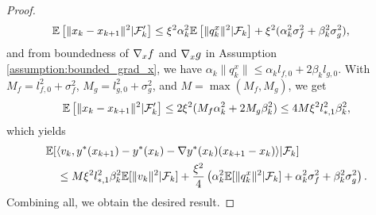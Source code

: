 \begin{proof}
    \begin{align*}
        \mathbb{E}\left[\|x_{k} - x_{k+1}\|^2 | \mathcal{F}_{k}' \right] &\le \xi^2 \alpha_k^2 \mathbb{E}\left[\|q_k^x\|^2 | \mathcal{F}_{k} \right] + \xi^2 (\alpha_k^2 \sigma_f^2 + \beta_k^2 \sigma_g^2),
    \end{align*}
    and from boundedness of $\nabla_x f$ and $\nabla_x g$ in Assumption \ref{assumption:bounded_grad_x}, we have $\alpha_k \|q_k^x\| \le \alpha_k l_{f,0} + 2 \beta_k l_{g,0}$. With $M_f = l_{f,0}^2 + \sigma_f^2$, $M_g = l_{g,0}^2 + \sigma_g^2$, and $M = \max(M_f, M_g)$, we get
    \begin{align*}
        \mathbb{E}\left[\|x_{k} - x_{k+1}\|^2 | \mathcal{F}_{k}' \right] \le 2 \xi^2 (M_f \alpha_k^2 + 2 M_g \beta_k^2) \le 4M\xi^2 l_{*,1}^2 \beta_k^2, 
    \end{align*}
    which yields
    \begin{align*}
        & \mathbb{E}[\langle v_k, y^*(x_{k+1}) - y^*(x_k) - \nabla y^*(x_k) (x_{k+1} - x_k) \rangle | \mathcal{F}_k] \\
        &\quad \le M \xi^2 l_{*,1}^2 \beta_k^2 \mathbb{E}[\|v_k\|^2 | \mathcal{F}_k]  
        + \frac{\xi^2}{4} \left(\alpha_k^2 \mathbb{E}[\|q_k^x\|^2 | \mathcal{F}_k ]  + \alpha_k^2 \sigma_f^2 + \beta_k^2 \sigma_g^2 \right). 
    \end{align*}
    Combining all, we obtain the desired result. 
\end{proof}












